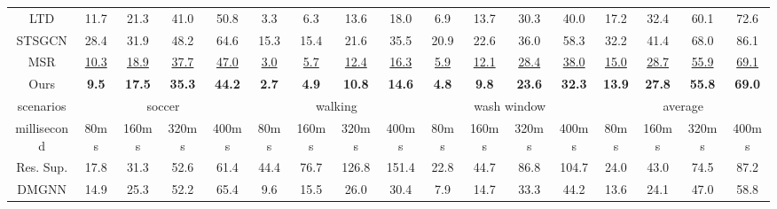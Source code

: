 \begin{table}[ht]
{\begin{tabular}{c|cccc|cccc|cccc|cccc}
    LTD          & 11.7          & 21.3          & 41.0          & 50.8          & 3.3          & 6.3           & 13.6          & 18.0          & 6.9          & 13.7         & 30.3          & 40.0          & 17.2          & 32.4          & 60.1          & 72.6          \\
    STSGCN      &28.4        &31.9         &48.2            & 64.6          &15.3      &15.4    &21.6      &35.5        &20.9         &22.6           &36.0            &58.3                &32.2           &41.4          &68.0      &86.1 \\ 
    MSR          & \underline{10.3}          & \underline{18.9}          & \underline{37.7}          & \underline{47.0}          & \underline{3.0}          & \underline{5.7}           & \underline{12.4}          & \underline{16.3}          & \underline{5.9}          & \underline{12.1}         & \underline{28.4}          & \underline{38.0}          & \underline{15.0}          & \underline{28.7}          & \underline{55.9}          & \underline{69.1}          \\
    Ours          & \textbf{9.5}  & \textbf{17.5} & \textbf{35.3} & \textbf{44.2} & \textbf{2.7} & \textbf{4.9}  & \textbf{10.8} & \textbf{14.6} & \textbf{4.8} & \textbf{9.8} & \textbf{23.6} & \textbf{32.3} & \textbf{13.9} & \textbf{27.8} & \textbf{55.8} & \textbf{69.0} \\ \hline
    scenarios    & \multicolumn{4}{c|}{soccer}                                    & \multicolumn{4}{c|}{walking}                                  & \multicolumn{4}{c|}{wash window}                              & \multicolumn{4}{c}{average}                                   \\ \hline
    millisecond  & 80ms          & 160ms         & 320ms         & 400ms         & 80ms         & 160ms         & 320ms         & 400ms         & 80ms         & 160ms        & 320ms         & 400ms         & 80ms          & 160ms         & 320ms         & 400ms         \\ \hline
    Res. Sup. & 17.8          & 31.3          & 52.6          & 61.4          & 44.4         & 76.7          & 126.8         & 151.4         & 22.8         & 44.7         & 86.8          & 104.7         & 24.0          & 43.0          & 74.5          & 87.2          \\
    DMGNN        & 14.9          & 25.3          & 52.2          & 65.4          & 9.6          & 15.5          & 26.0          & 30.4          & 7.9          & 14.7         & 33.3          & 44.2          & 13.6          & 24.1          & 47.0          & 58.8          \\
    

\end{tabular}}
\end{table}
